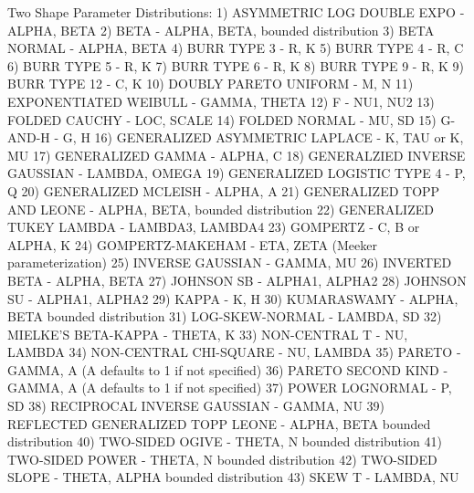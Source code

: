Two Shape Parameter Distributions:
      1) ASYMMETRIC LOG DOUBLE EXPO     - ALPHA, BETA
      2) BETA                           - ALPHA, BETA,
                                          bounded distribution
      3) BETA NORMAL                    - ALPHA, BETA
      4) BURR TYPE 3                    - R, K
      5) BURR TYPE 4                    - R, C
      6) BURR TYPE 5                    - R, K
      7) BURR TYPE 6                    - R, K
      8) BURR TYPE 9                    - R, K
      9) BURR TYPE 12                   - C, K
     10) DOUBLY PARETO UNIFORM          - M, N
     11) EXPONENTIATED WEIBULL          - GAMMA, THETA
     12) F                              - NU1, NU2
     13) FOLDED CAUCHY                  - LOC, SCALE
     14) FOLDED NORMAL                  - MU, SD
     15) G-AND-H                        - G, H
     16) GENERALIZED ASYMMETRIC LAPLACE - K, TAU or K, MU
     17) GENERALIZED GAMMA              - ALPHA, C
     18) GENERALZIED INVERSE GAUSSIAN   - LAMBDA, OMEGA
     19) GENERALIZED LOGISTIC TYPE 4    - P, Q
     20) GENERALIZED MCLEISH            - ALPHA, A
     21) GENERALIZED TOPP AND LEONE     - ALPHA, BETA,
                                          bounded distribution
     22) GENERALIZED TUKEY LAMBDA       - LAMBDA3, LAMBDA4
     23) GOMPERTZ                       - C, B or ALPHA, K
     24) GOMPERTZ-MAKEHAM               - ETA, ZETA
                                          (Meeker parameterization)
     25) INVERSE GAUSSIAN               - GAMMA, MU
     26) INVERTED BETA                  - ALPHA, BETA
     27) JOHNSON SB                     - ALPHA1, ALPHA2
     28) JOHNSON SU                     - ALPHA1, ALPHA2
     29) KAPPA                          - K, H
     30) KUMARASWAMY                    - ALPHA, BETA
                                          bounded distribution
     31) LOG-SKEW-NORMAL                - LAMBDA, SD
     32) MIELKE'S BETA-KAPPA            - THETA, K
     33) NON-CENTRAL T                  - NU, LAMBDA
     34) NON-CENTRAL CHI-SQUARE         - NU, LAMBDA
     35) PARETO                         - GAMMA, A (A defaults to 1
                                          if not specified)
     36) PARETO SECOND KIND             - GAMMA, A (A defaults to 1
                                          if not specified)
     37) POWER LOGNORMAL                - P, SD
     38) RECIPROCAL INVERSE GAUSSIAN    - GAMMA, NU
     39) REFLECTED GENERALIZED TOPP LEONE - ALPHA, BETA
                                          bounded distribution
     40) TWO-SIDED OGIVE                - THETA, N
                                          bounded distribution
     41) TWO-SIDED POWER                - THETA, N
                                          bounded distribution
     42) TWO-SIDED SLOPE                - THETA, ALPHA
                                          bounded distribution
     43) SKEW T                         - LAMBDA, NU
    
